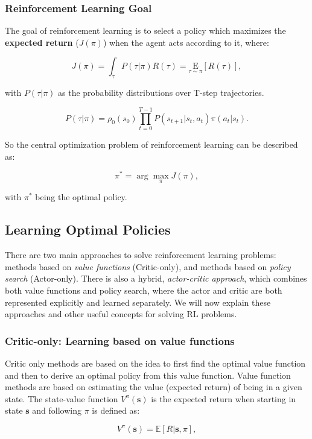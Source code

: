 \subsubsection{Reinforcement Learning Goal}

The goal of reinforcement learning is to select a policy which maximizes the \textbf{expected return} ($ J(\pi) $) when the agent acts according to it, where:
\begin{center}
	\begin{equation} \label{eq:expected_return}
		J(\pi)=\int_{\tau} P(\tau | \pi) R(\tau)=\underset{\tau \sim \pi}{\mathrm{E}}[R(\tau)],
	\end{equation}
\end{center}

with $ P(\tau | \pi) $ as the probability distributions over T-step trajectories.
\begin{center}
	\begin{equation}
		P(\tau | \pi)=\rho_{0}\left(s_{0}\right) \prod_{t=0}^{T-1} P\left(s_{t+1} | s_{t}, a_{t}\right) \pi\left(a_{t} | s_{t}\right).
	\end{equation}
\end{center}

So the central optimization problem of reinforcement learning can be described as:
\begin{center}
	\begin{equation}
		\pi^{*}=\arg \max _{\pi} J(\pi),
	\end{equation}
\end{center}
with $\pi^*$ being the optimal policy.


\subsection{Learning Optimal Policies}

There are two main approaches to solve reinforcement learning problems: methods based on \textit{value functions} (Critic-only), and methods based on \textit{policy search} (Actor-only). There is also a hybrid, \textit{actor-critic approach}, which combines both value functions and policy search, where the actor and critic are both represented explicitly and learned separately. We will now explain these approaches and other useful concepts for solving RL problems.

\subsubsection{Critic-only: Learning based on value functions}
Critic only methods are based on the idea to first find the optimal value function and then to derive an optimal policy from this value function.  Value function methods are based on estimating the value (expected return) of being in a given state. The state-value function $V^{\pi}(\mathbf{s})$ is the expected return when starting in state $\mathbf{s}$ and following $\pi$ is defined as:
\begin{center}
	        \begin{equation}
	                V^{\pi}(\mathbf{s})=\mathbb{E}[R | \mathbf{s}, \pi],
	        \end{equation}
\end{center}

